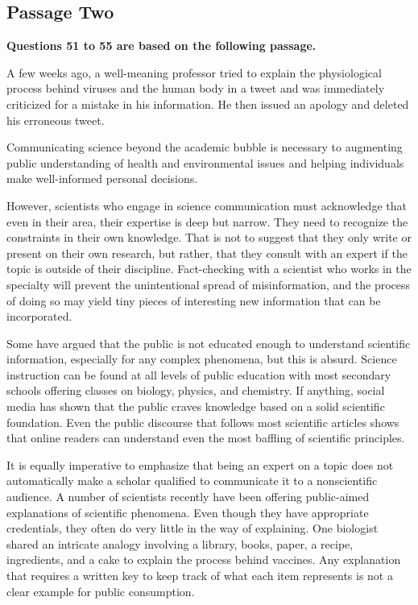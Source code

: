 \documentclass[UTF8,11pt]{ctexart}
\begin{document}
\subsection*{\textbf{Passage Two}}


\textbf{Questions 51 to 55 are based on the following passage.}


A few weeks ago, a well-meaning professor tried to explain the physiological process behind viruses and the human body in a tweet and was immediately criticized for a mistake in his information. He then issued an apology and deleted his erroneous tweet.


Communicating science beyond the academic bubble is necessary to augmenting public understanding of health and environmental issues and helping individuals make well-informed personal decisions.


However, scientists who engage in science communication must acknowledge that even in their area, their expertise is deep but narrow. They need to recognize the constraints in their own knowledge. That is not to suggest that they only write or present on their own research, but rather, that they consult with an expert if the topic is outside of their discipline. Fact-checking with a scientist who works in the specialty will prevent the unintentional spread of misinformation, and the process of doing so may yield tiny pieces of interesting new information that can be incorporated.


Some have argued that the public is not educated enough to understand scientific information, especially for any complex phenomena, but this is absurd. Science instruction can be found at all levels of public education with most secondary schools offering classes on biology, physics, and chemistry. If anything, social media has shown that the public craves knowledge based on a solid scientific foundation. Even the public discourse that follows most scientific articles shows that online readers can understand even the most baffling of scientific principles.


It is equally imperative to emphasize that being an expert on a topic does not automatically make a scholar qualified to communicate it to a nonscientific audience. A number of scientists recently have been offering public-aimed explanations of scientific phenomena. Even though they have appropriate credentials, they often do very little in the way of explaining. One biologist shared an intricate analogy involving a library, books, paper, a recipe, ingredients, and a cake to explain the process behind vaccines. Any explanation that requires a written key to keep track of what each item represents is not a clear example for public consumption.
\end{document}
